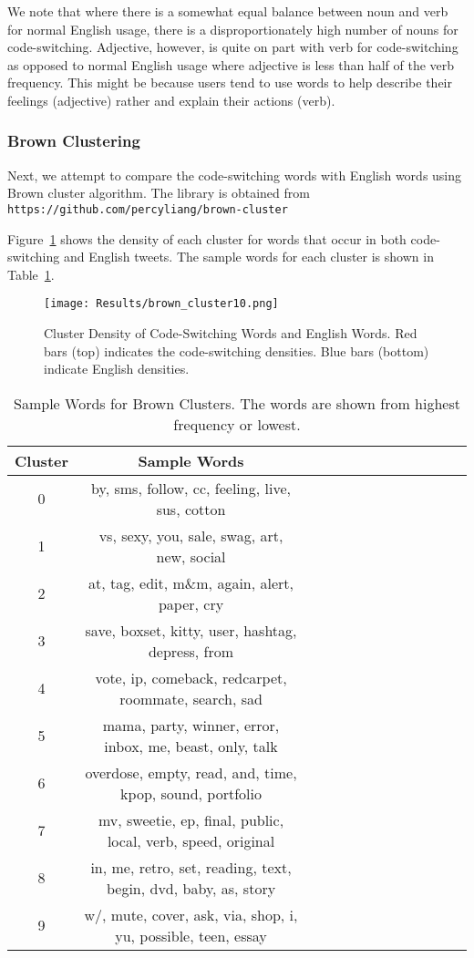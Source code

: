 \documentclass[conference]{IEEEtran}
\begin{document}
We note that where there is a somewhat equal balance between noun and verb for normal English usage, there is a disproportionately high number of nouns for code-switching. Adjective, however, is quite on part with verb for code-switching as opposed to normal English usage where adjective is less than half of the verb frequency. This might be because users tend to use words to help describe their feelings (adjective) rather and explain their actions (verb). 


\subsubsection{Brown Clustering}
Next, we attempt to compare the code-switching words with English words using Brown cluster algorithm. The library is obtained from \verb|https://github.com/percyliang/brown-cluster|

Figure~\ref{fig:brown} shows the density of each cluster for words that occur in both code-switching and English tweets. The sample words for each cluster is shown in Table~\ref{tab:sampleBrown}. 

\begin{figure}[H]
	\centering
	\texttt{[image: Results/brown\_cluster10.png]}
	\caption{Cluster Density of Code-Switching Words and English Words. Red bars (top) indicates the code-switching densities. Blue bars (bottom) indicate English densities.}
	\label{fig:brown}
\end{figure}


\begin{table}[h!] 
 \caption{Sample Words for Brown Clusters. The words are shown from highest frequency or lowest. }
\centering %
\begin{tabular}{c c c c c c rrrrrrr} %
\hline\hline %
Cluster		&	Sample Words	
\\ [0.5ex] 
\hline 
0  	&	by, sms, follow,  cc, feeling, live, sus, cotton	 \\ 
1 	&	vs, sexy, you, sale, swag, art, new, social	 \\ 
2  	&	at, tag,  edit, m$\&$m, again, alert, paper, cry 	 \\ 
3 	&	save,  boxset, kitty, user, hashtag, depress, from	 \\
4 	&	vote,  ip, comeback, redcarpet, roommate,  search, sad	\\
5 	&	mama, party, winner, error, inbox, me, beast, only, talk	 \\
6  	&	overdose, empty, read, and, time, kpop, sound, portfolio	 \\
7 	&	mv, sweetie, ep, final, public, local, verb, speed, original 	 \\
8	&	in, me, retro, set, reading, text, begin, dvd, baby, as, story 	 \\
9  	&	w/, mute, cover, ask, via, shop, i, yu, possible, teen, essay 	 \\
\hline %
\end{tabular} 
\label{tab:sampleBrown} 
\end{table} 
\end{document}
